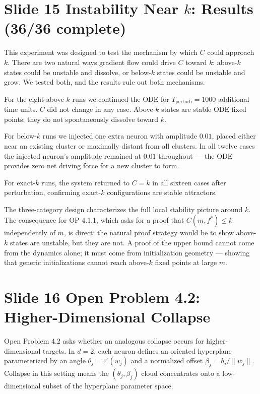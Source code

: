 \documentclass[11pt]{article}
\begin{document}
\section*{Slide 15 \quad Instability Near $k$: Results (36/36 complete)}

This experiment was designed to test the mechanism by which $C$ could approach $k$.
There are two natural ways gradient flow could drive $C$ toward $k$: above-$k$ states could be unstable and dissolve, or below-$k$ states could be unstable and grow.
We tested both, and the results rule out both mechanisms.

For the eight above-$k$ runs we continued the ODE for $T_{\text{perturb}} = 1000$ additional time units.
$C$ did not change in any case.
Above-$k$ states are stable ODE fixed points; they do not spontaneously dissolve toward $k$.

For below-$k$ runs we injected one extra neuron with amplitude $0.01$, placed either near an existing cluster or maximally distant from all clusters.
In all twelve cases the injected neuron's amplitude remained at $0.01$ throughout --- the ODE provides zero net driving force for a new cluster to form.

For exact-$k$ runs, the system returned to $C = k$ in all sixteen cases after perturbation, confirming exact-$k$ configurations are stable attractors.

The three-category design characterizes the full local stability picture around $k$.
The consequence for OP 4.1.1, which asks for a proof that $C(m, f^*) \leq k$ independently of $m$, is direct: the natural proof strategy would be to show above-$k$ states are unstable, but they are not.
A proof of the upper bound cannot come from the dynamics alone; it must come from initialization geometry --- showing that generic initializations cannot reach above-$k$ fixed points at large $m$.

\section*{Slide 16 \quad Open Problem 4.2: Higher-Dimensional Collapse}

Open Problem 4.2 asks whether an analogous collapse occurs for higher-dimensional targets.
In $d = 2$, each neuron defines an oriented hyperplane parameterized by an angle $\theta_j = \angle(w_j)$ and a normalized offset $\beta_j = b_j / \|w_j\|$.
Collapse in this setting means the $(\theta_j, \beta_j)$ cloud concentrates onto a low-dimensional subset of the hyperplane parameter space.
\end{document}
